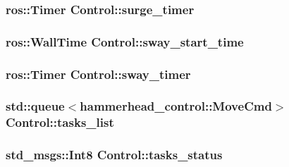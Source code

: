 \subsubsection[{\texorpdfstring{surge\+\_\+timer}{surge_timer}}]{\setlength{\rightskip}{0pt plus 5cm}ros\+::\+Timer Control\+::surge\+\_\+timer\hspace{0.3cm}{\ttfamily [private]}}\hypertarget{classControl_a01b569ce4cb201b75b1304800c5957f1}{}\label{classControl_a01b569ce4cb201b75b1304800c5957f1}
\subsubsection[{\texorpdfstring{sway\+\_\+start\+\_\+time}{sway_start_time}}]{\setlength{\rightskip}{0pt plus 5cm}ros\+::\+Wall\+Time Control\+::sway\+\_\+start\+\_\+time\hspace{0.3cm}{\ttfamily [private]}}\hypertarget{classControl_a1d05716c729b56329776ab242498d2dd}{}\label{classControl_a1d05716c729b56329776ab242498d2dd}
\subsubsection[{\texorpdfstring{sway\+\_\+timer}{sway_timer}}]{\setlength{\rightskip}{0pt plus 5cm}ros\+::\+Timer Control\+::sway\+\_\+timer\hspace{0.3cm}{\ttfamily [private]}}\hypertarget{classControl_a5b838b01bae62bcd23ddb8089a73b217}{}\label{classControl_a5b838b01bae62bcd23ddb8089a73b217}
\subsubsection[{\texorpdfstring{tasks\+\_\+list}{tasks_list}}]{\setlength{\rightskip}{0pt plus 5cm}std\+::queue$<$hammerhead\+\_\+control\+::\+Move\+Cmd$>$ Control\+::tasks\+\_\+list\hspace{0.3cm}{\ttfamily [private]}}\hypertarget{classControl_a8253a25dca4732520650a20d04bc444c}{}\label{classControl_a8253a25dca4732520650a20d04bc444c}
\subsubsection[{\texorpdfstring{tasks\+\_\+status}{tasks_status}}]{\setlength{\rightskip}{0pt plus 5cm}std\+\_\+msgs\+::\+Int8 Control\+::tasks\+\_\+status\hspace{0.3cm}{\ttfamily [private]}}\hypertarget{classControl_a33f504fc4fc4d72aece54ac1d54e0dce}{}\label{classControl_a33f504fc4fc4d72aece54ac1d54e0dce}
